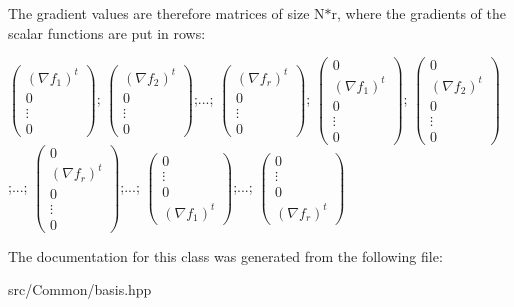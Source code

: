 The gradient values are therefore matrices of size N$\ast$r, where the gradients of the scalar functions are put in rows\+:

$\left(\begin{array}{c}(\nabla f_1)^t\\0\\\vdots\\0\end{array}\right)$; $\left(\begin{array}{c}(\nabla f_2)^t\\0\\\vdots\\0\end{array}\right)$;...; $\left(\begin{array}{c}(\nabla f_r)^t\\0\\\vdots\\0\end{array}\right)$; $\left(\begin{array}{c}0\\(\nabla f_1)^t\\0\\\vdots\\0\end{array}\right)$; $\left(\begin{array}{c}0\\(\nabla f_2)^t\\0\\\vdots\\0\end{array}\right)$;...; $\left(\begin{array}{c}0\\(\nabla f_r)^t\\0\\\vdots\\0\end{array}\right)$;...; $\left(\begin{array}{c}0\\\vdots\\0\\(\nabla f_1)^t\end{array}\right)$;...; $\left(\begin{array}{c}0\\\vdots\\0\\(\nabla f_r)^t\end{array}\right)$ 

The documentation for this class was generated from the following file\+:\begin{DoxyCompactItemize}
\item 
src/\+Common/basis.\+hpp\end{DoxyCompactItemize}

